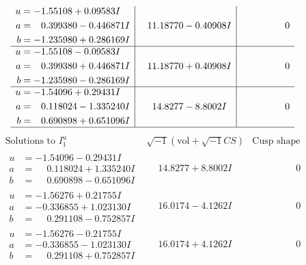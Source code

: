 \documentclass[1p]{elsarticle_modified}
\theoremstyle{definition}
\newcommand{\I}{\sqrt{-1}}
\begin{document}
$$\begin{array}{c|c|c}
\begin{aligned}
u &= -1.55108 + 0.09583 I \\
a &= \phantom{-}0.399380 - 0.446871 I \\
b &= -1.235980 + 0.286169 I\end{aligned}
 & \phantom{-}11.18770 - 0.40908 I & \phantom{-0.000000 } 0 \\ \hline\begin{aligned}
u &= -1.55108 - 0.09583 I \\
a &= \phantom{-}0.399380 + 0.446871 I \\
b &= -1.235980 - 0.286169 I\end{aligned}
 & \phantom{-}11.18770 + 0.40908 I & \phantom{-0.000000 } 0 \\ \hline\begin{aligned}
u &= -1.54096 + 0.29431 I \\
a &= \phantom{-}0.118024 - 1.335240 I \\
b &= \phantom{-}0.690898 + 0.651096 I\end{aligned}
 & \phantom{-}14.8277 - 8.8002 I & \phantom{-0.000000 } 0\\
 \hline 
 \end{array}$$\newpage$$\begin{array}{c|c|c}  
\text{Solutions to }I^u_{1}& \I (\text{vol} + \sqrt{-1}CS) & \text{Cusp shape}\\
 \hline 
\begin{aligned}
u &= -1.54096 - 0.29431 I \\
a &= \phantom{-}0.118024 + 1.335240 I \\
b &= \phantom{-}0.690898 - 0.651096 I\end{aligned}
 & \phantom{-}14.8277 + 8.8002 I & \phantom{-0.000000 } 0 \\ \hline\begin{aligned}
u &= -1.56276 + 0.21755 I \\
a &= -0.336855 + 1.023130 I \\
b &= \phantom{-}0.291108 - 0.752857 I\end{aligned}
 & \phantom{-}16.0174 - 4.1262 I & \phantom{-0.000000 } 0 \\ \hline\begin{aligned}
u &= -1.56276 - 0.21755 I \\
a &= -0.336855 - 1.023130 I \\
b &= \phantom{-}0.291108 + 0.752857 I\end{aligned}
 & \phantom{-}16.0174 + 4.1262 I & \phantom{-0.000000 } 0 \\ \hline\begin{aligned}

\end{aligned}
\end{array}$$
\end{document}

